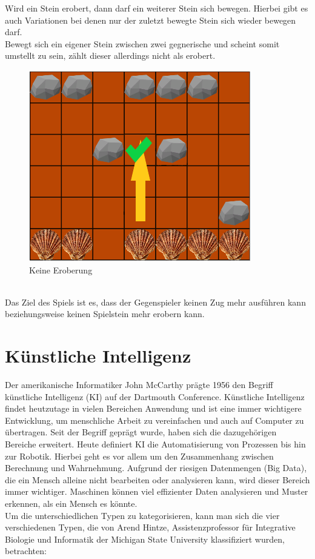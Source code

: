 Wird ein Stein erobert, dann darf ein weiterer Stein sich bewegen. Hierbei gibt es auch Variationen bei denen nur der zuletzt bewegte Stein sich wieder bewegen darf.\\
Bewegt sich ein eigener Stein zwischen zwei gegnerische und scheint somit umstellt zu sein, zählt dieser allerdings nicht als erobert.\\
\begin{figure}[h]
	\centering
	\includegraphics{img/regeln_nichterobert}
	\caption{Keine Eroberung}
	\label{fig:nichterobern}
\end{figure}
\\
Das Ziel des Spiels ist es, dass der Gegenspieler keinen Zug mehr ausführen kann beziehungsweise keinen Spielstein mehr erobern kann.


\section{Künstliche Intelligenz}
\label{ch:Grundlagen:sec:Abschnitt2}
\nocite{computerweekly}
\nocite{barr2014handbook}

Der amerikanische Informatiker John McCarthy prägte 1956 den Begriff künstliche Intelligenz (KI) auf der Dartmouth Conference.
Künstliche Intelligenz findet heutzutage in vielen Bereichen Anwendung und ist eine immer wichtigere Entwicklung, um menschliche Arbeit zu vereinfachen und auch auf Computer zu übertragen. Seit der Begriff geprägt wurde, haben sich die dazugehörigen Bereiche erweitert. Heute definiert KI die Automatisierung von Prozessen bis hin zur Robotik.
Hierbei geht es vor allem um den Zusammenhang zwischen Berechnung und Wahrnehmung.
Aufgrund der riesigen Datenmengen (Big Data), die ein Mensch alleine nicht bearbeiten oder analysieren kann, wird dieser Bereich immer wichtiger. Maschinen können viel effizienter Daten analysieren und Muster erkennen, als ein Mensch es könnte.\\
Um die unterschiedlichen Typen zu kategorisieren, kann man sich die vier verschiedenen Typen, die von Arend Hintze, Assistenzprofessor für Integrative Biologie und Informatik der Michigan State University klassifiziert wurden, betrachten:

